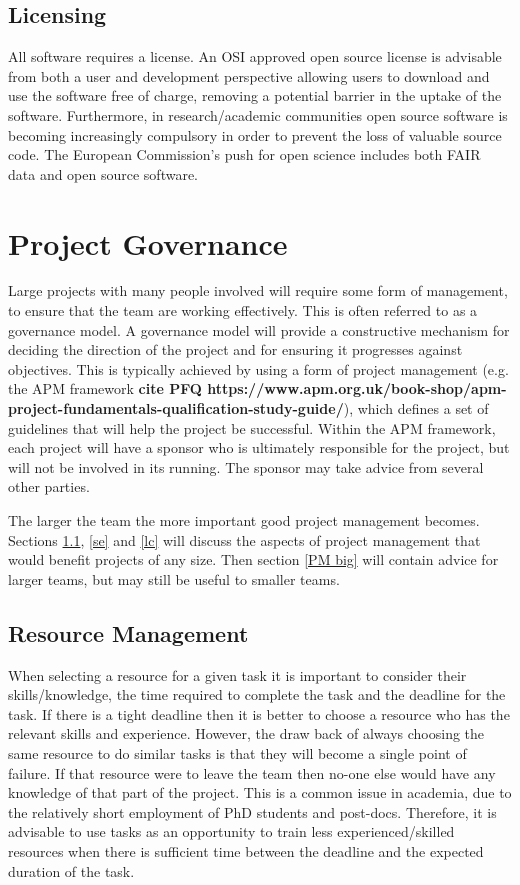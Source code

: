 \documentclass[jnr]{iosart2x}
\newcommand{\todo}[1]{\textbf{#1}}
\begin{document}
\subsection{Licensing}
\label{Licensing}

All software requires a license.
An OSI approved \cite{OSI_Licenses} open source license is advisable from both a user and development perspective allowing users to download and use the software free of charge, removing a potential barrier in the uptake of the software.
Furthermore, in research/academic communities open source software is becoming increasingly compulsory in order to prevent the loss of valuable source code.
The European Commission's push for open science \cite{EOSC} includes both FAIR data and open source software.

\section{Project Governance}
\label{Project Governance}

Large projects with many people involved will require some form of management, to ensure that the team are working effectively.
This is often referred to as a governance model.
A governance model will provide a constructive mechanism for deciding the direction of the project and for ensuring it progresses against objectives.
This is typically achieved by using a form of project management (e.g. the APM framework \todo{cite PFQ https://www.apm.org.uk/book-shop/apm-project-fundamentals-qualification-study-guide/}), which defines a set of guidelines that will help the project be successful.
Within the APM framework, each project will have a sponsor who is ultimately responsible for the project, but will not be involved in its running.
The sponsor may take advice from several other parties.

The larger the team the more important good project management becomes.
Sections \ref{rman}, \ref{se} and \ref{lc} will discuss the aspects of project management that would benefit projects of any size.
Then section \ref{PM big} will contain advice for larger teams, but may still be useful to smaller teams.

\subsection{Resource Management}
\label{rman}

When selecting a resource for a given task it is important to consider their skills/knowledge, the time required to complete the task and the deadline for the task.
If there is a tight deadline then it is better to choose a resource who has the relevant skills and experience.
However, the draw back of always choosing the same resource to do similar tasks is that they will become a single point of failure.
If that resource were to leave the team then no-one else would have any knowledge of that part of the project.
This is a common issue in academia, due to the relatively short employment of PhD students and post-docs.
Therefore, it is advisable to use tasks as an opportunity to train less experienced/skilled resources when there is sufficient time between the deadline and the expected duration of the task.
\end{document}
